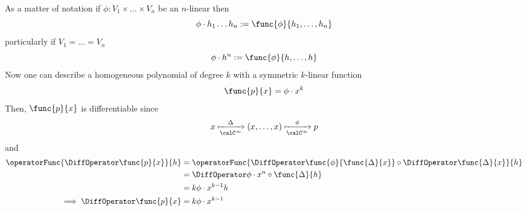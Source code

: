 As a matter of notation if \(\phi : V_1 \times \dots \times V_n\) be an \(n\)-linear then
\begin{equation*}
    \phi \cdot h_1\dots h_n := \func{\phi}{h_1, \dots , h_n}
\end{equation*}
particularly if \(V_1 = \dots = V_n\)
\begin{equation*}
    \phi \cdot h^n := \func{\phi}{h, \dots , h}
\end{equation*}
Now one can describe a homogeneous polynomial of degree \(k\) with a symmetric \(k\)-linear function
\begin{align*}
    \func{p}{x} = \phi \cdot x^k
\end{align*}
Then, \(\func{p}{x}\) is differentiable since
\begin{equation*}
    x \xmapsto[\calC^\infty]{\Delta} (x,\dots,x) \xmapsto[\calC^\infty]{\phi} p
\end{equation*}
and
\begin{align*}
    \operatorFunc{\DiffOperator \func{p}{x}}{h} & = \operatorFunc{\DiffOperator \func{\phi}{\func{\Delta}{x}} \circ \DiffOperator \func{\Delta}{x}}{h} \\
                                                & = \DiffOperator \phi \cdot x^n \circ \func{\Delta}{h}                                                \\
                                                & = k \phi \cdot x^{k-1}h                                                                              \\
    \implies \DiffOperator \func{p}{x}          & = k \phi \cdot x^{k-1}
\end{align*}

